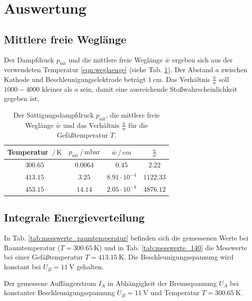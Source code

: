 \section{Auswertung}
\subsection{Mittlere freie Weglänge}
Der Dampfdruck $p_\text{sät}$ und die mittlere freie Weglänge $\bar{w}$ ergeben sich aus der verwendeten Temperatur \ref{eqn:weglaenge} (siehe Tab. \ref{tab:weglaenge}).
Der Abstand $a$ zwischen Kathode und Beschleunigungselektrode beträgt $\SI{1}{\centi\metre}$.
Das Verhältnis $\frac{\bar{w}}{a}$ soll $1000 - 4000$ kleiner als $a$ sein, damit eine ausreichende Stoßwahrscheinlichkeit gegeben ist.
\begin{table}
    \centering
    \begin{tabular}{cccc}
        \toprule
        Temperatur $\,/\, \si{\kelvin}$ & $p_\text{sät} \,/\, \si{\milli\bar}$ & $\bar{w} \,/\, \si{cm}$ & $\frac{a}{\bar{w}}$ \\
        \midrule
        $300.65$ & $0.0064$ & $0.45$ & $2.22$ \\
        $413.15$ & $3.25$ & $8.91 \cdot 10^{-4}$ & $1122.33$ \\
        $453.15$ & $14.14$ & $2.05 \cdot 10^{-4}$ & $4876.12$ \\
        \bottomrule
    \end{tabular}
    \caption{Der Sättigungsdampfdruck $p_\text{sät}$, die mittlere freie Weglänge $\bar{w}$ und das Verhältnis $\frac{a}{\bar{w}}$ für die Gefäßtemperatur $T$.}
    \label{tab:weglaenge}
\end{table}

\FloatBarrier
\subsection{Integrale Energieverteilung}
In Tab. \ref{tab:messwerte_raumtemperatur} befinden sich die gemessenen Werte bei Raumtemperatur ($T=\SI{300.65}{\kelvin}$) und in Tab. \ref{tab:messwerte_140} die Messwerte bei einer Gefäßtemperatur $T=\SI{413.15}{\kelvin}$.
Die Beschleunigungsspannung wird konstant bei $U_B = \SI{11}{\volt}$ gehalten.
\begin{table}
    \centering
    \caption{Der gemessene Auffängerstrom $I_A$ in Abhängigkeit der Bremsspannung $U_A$ bei konstanter Beschleunigungsspannung $U_B = \SI{11}{\volt}$ und Temperatur $T = \SI{300.65}{\kelvin}$.}
    \label{tab:messwerte_raumtemperatur}  
\end{table}

